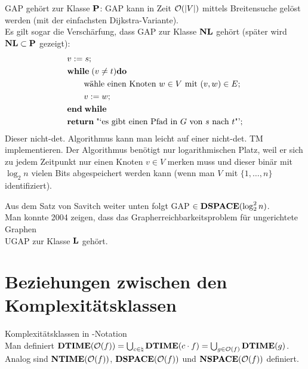 \begin{Bem}
    GAP gehört zur Klasse $\P$:
    GAP kann in Zeit $\O(|V|)$ mittels Breitensuche gelöst werden
    (mit der einfachsten Dijkstra-Variante).\\
    Es gilt sogar die Verschärfung, dass GAP zur Klasse $\NL$ gehört
    (später wird $\NL \subset \P$ gezeigt):
    \begin{align*}
        &v := s;\\
        &\WHILE (v \not= t) \DO\\
        &\qquad \text{wähle einen Knoten } w \in V \text{ mit } (v, w) \in E;\\
        &\qquad v := w;\\
        &\END\WHILE\\
        &\RETURN \text{"`es gibt einen Pfad in } G \text{ von } s \text{ nach } t \text{"'};
    \end{align*}
    Dieser nicht-det. Algorithmus kann man leicht auf einer nicht-det. TM implementieren.
    Der Algorithmus benötigt nur logarithmischen Platz, weil er sich zu jedem Zeitpunkt
    nur einen Knoten $v \in V$ merken muss und dieser binär mit $\log_2 n$ vielen Bits
    abgespeichert werden kann (wenn man $V$ mit $\{1, \dotsc, n\}$ identifiziert).
\end{Bem}

\begin{Bem}
    Aus dem Satz von Savitch weiter unten folgt GAP $\in \DSPACE(\log_2^2 n)$.\\
    Man konnte 2004 zeigen, dass das Grapherreichbarkeitsproblem für ungerichtete Graphen\\
    UGAP zur Klasse $\L$ gehört.
\end{Bem}

\section{%
    Beziehungen zwischen den Komplexitätsklassen%
}

\begin{Def}{Komplexitätsklassen in -Notation}\\
    Man definiert $\DTIME(\O(f)) = \bigcup_{c \in \natural} \DTIME(c \cdot f) =
    \bigcup_{g \in \O(f)} \DTIME(g)$.\\
    Analog sind $\NTIME(\O(f))$, $\DSPACE(\O(f))$ und $\NSPACE(\O(f))$ definiert.
\end{Def}

